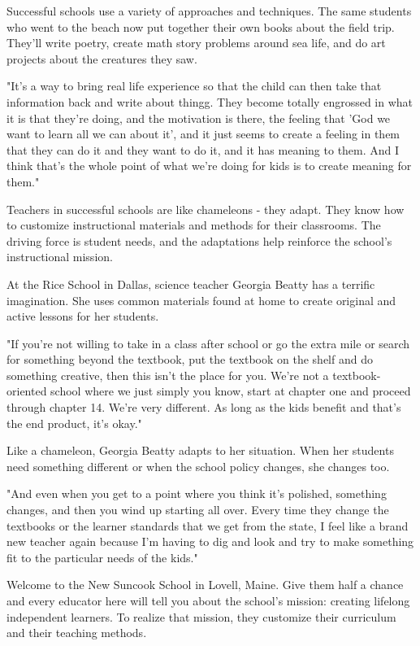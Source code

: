 Successful schools use a variety of approaches and techniques. The same students who went to the beach now put together their own books about the field trip. They'll write poetry, create math story problems around sea life, and do art projects about the creatures they saw.

"It's a way to bring real life experience so that the child can then take that information back and write about thingg. They become totally engrossed in what it is that they're doing, and the motivation is there, the feeling that 'God we want to learn all we can about it', and it just seems to create a feeling in them that they can do it and they want to do it, and it has meaning to them. And I think that's the whole point of what we're doing for kids is to create meaning for them."

Teachers in successful schools are like chameleons - they adapt. They know how to customize instructional materials and methods for their classrooms. The driving force is student needs, and the adaptations help reinforce the school's instructional mission.

At the Rice School in Dallas, science teacher Georgia Beatty has a terrific imagination. She uses common materials found at home to create original and active lessons for her students.

"If you're not willing to take in a class after school or go the extra mile or search for something beyond the textbook, put the textbook on the shelf and do something creative, then this isn't the place for you. We're not a textbook-oriented school where we just simply you know, start at chapter one and proceed through chapter 14. We're very different. As long as the kids benefit and that's the end product, it's okay."

Like a chameleon, Georgia Beatty adapts to her situation. When her students need something different or when the school policy changes, she changes too.

"And even when you get to a point where you think it's polished, something changes, and then you wind up starting all over. Every time they change the textbooks or the learner standards that we get from the state, I feel like a brand new teacher again because I'm having to dig and look and try to make something fit to the particular needs of the kids."

Welcome to the New Suncook School in Lovell, Maine. Give them half a chance and every educator here will tell you about the school's mission: creating lifelong independent learners. To realize that mission, they customize their curriculum and their teaching methods.

